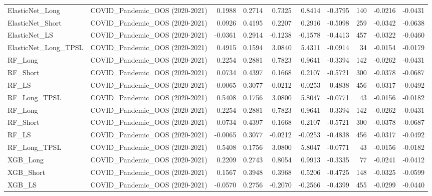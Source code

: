 \begin{tabular}{llrrrrrrrr}
\cline{1-10}
ElasticNet\_Long & COVID\_Pandemic\_OOS (2020-2021) & 0.1988 & 0.2714 & 0.7325 & 0.8414 & -0.3795 & 140 & -0.0216 & -0.0431 \\
\cline{1-10}
ElasticNet\_Short & COVID\_Pandemic\_OOS (2020-2021) & 0.0926 & 0.4195 & 0.2207 & 0.2916 & -0.5098 & 259 & -0.0342 & -0.0638 \\
\cline{1-10}
ElasticNet\_LS & COVID\_Pandemic\_OOS (2020-2021) & -0.0361 & 0.2914 & -0.1238 & -0.1578 & -0.4413 & 457 & -0.0322 & -0.0460 \\
\cline{1-10}
ElasticNet\_Long\_TPSL & COVID\_Pandemic\_OOS (2020-2021) & 0.4915 & 0.1594 & 3.0840 & 5.4311 & -0.0914 & 34 & -0.0154 & -0.0179 \\
\cline{1-10}
RF\_Long & COVID\_Pandemic\_OOS (2020-2021) & 0.2254 & 0.2881 & 0.7823 & 0.9641 & -0.3394 & 142 & -0.0262 & -0.0431 \\
\cline{1-10}
RF\_Short & COVID\_Pandemic\_OOS (2020-2021) & 0.0734 & 0.4397 & 0.1668 & 0.2107 & -0.5721 & 300 & -0.0378 & -0.0687 \\
\cline{1-10}
RF\_LS & COVID\_Pandemic\_OOS (2020-2021) & -0.0065 & 0.3077 & -0.0212 & -0.0253 & -0.4838 & 456 & -0.0317 & -0.0492 \\
\cline{1-10}
RF\_Long\_TPSL & COVID\_Pandemic\_OOS (2020-2021) & 0.5408 & 0.1756 & 3.0800 & 5.8047 & -0.0771 & 43 & -0.0156 & -0.0182 \\
\cline{1-10}
RF\_Long & COVID\_Pandemic\_OOS (2020-2021) & 0.2254 & 0.2881 & 0.7823 & 0.9641 & -0.3394 & 142 & -0.0262 & -0.0431 \\
\cline{1-10}
RF\_Short & COVID\_Pandemic\_OOS (2020-2021) & 0.0734 & 0.4397 & 0.1668 & 0.2107 & -0.5721 & 300 & -0.0378 & -0.0687 \\
\cline{1-10}
RF\_LS & COVID\_Pandemic\_OOS (2020-2021) & -0.0065 & 0.3077 & -0.0212 & -0.0253 & -0.4838 & 456 & -0.0317 & -0.0492 \\
\cline{1-10}
RF\_Long\_TPSL & COVID\_Pandemic\_OOS (2020-2021) & 0.5408 & 0.1756 & 3.0800 & 5.8047 & -0.0771 & 43 & -0.0156 & -0.0182 \\
\cline{1-10}
XGB\_Long & COVID\_Pandemic\_OOS (2020-2021) & 0.2209 & 0.2743 & 0.8054 & 0.9913 & -0.3335 & 77 & -0.0241 & -0.0412 \\
\cline{1-10}
XGB\_Short & COVID\_Pandemic\_OOS (2020-2021) & 0.1567 & 0.3948 & 0.3968 & 0.5206 & -0.4725 & 148 & -0.0325 & -0.0599 \\
\cline{1-10}
XGB\_LS & COVID\_Pandemic\_OOS (2020-2021) & -0.0570 & 0.2756 & -0.2070 & -0.2566 & -0.4399 & 455 & -0.0299 & -0.0440 \\

\end{tabular}
